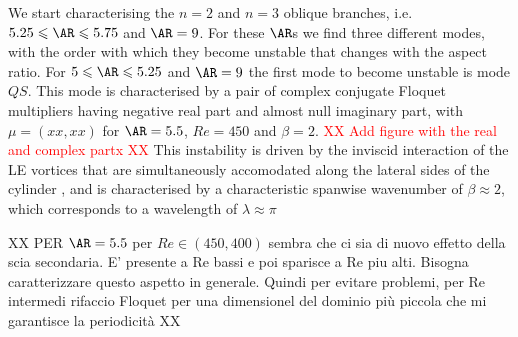 We start characterising the $n=2$ and $n=3$ oblique branches, i.e. $5.25 \le \AR \le 5.75$ and $\AR=9$. For these $\AR$s we find three different modes, with the order with which they become unstable that changes with the aspect ratio. For $5 \le \AR \le 5.25$ and $\AR=9$ the first mode to become unstable is mode $QS$. This mode is characterised by a pair of complex conjugate Floquet multipliers having negative real part and almost null imaginary part, with $\mu = (xx,xx)$ for $\AR=5.5$, $Re=450$ and $\beta=2$. \textcolor{red}{XX Add figure with the real and complex partx XX} This instability is driven by the inviscid interaction of the LE vortices that are simultaneously accomodated along the lateral sides of the cylinder \citep{pierrhumbert-widnall-1982}, and is characterised by a characteristic spanwise wavenumber of $\beta \approx 2$, which corresponds to a wavelength of $\lambda \approx \pi$


XX PER $\AR=5.5$ per $Re \in (450,400)$ sembra che ci sia di nuovo effetto della scia secondaria. E' presente a Re bassi e poi sparisce a Re piu alti. Bisogna caratterizzare questo aspetto in generale. Quindi per evitare problemi, per Re intermedi rifaccio Floquet per una dimensionel del dominio più piccola che mi garantisce la periodicità XX

